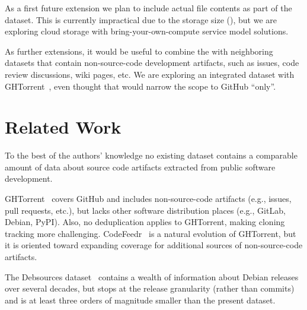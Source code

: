 As a first future extension we plan to include actual file contents as part of
the dataset. This is currently impractical due to the storage size (),
but we are exploring cloud storage with bring-your-own-compute service model
solutions.

As further extensions, it would be useful to combine the \SWHGD with neighboring
datasets that contain non-source-code development artifacts, such as issues,
code review discussions, wiki pages, etc. We are exploring an integrated
dataset with GHTorrent~\cite{DBLP:conf/msr/GousiosS12}, even thought that would
narrow the scope to GitHub ``only''.


\section{Related Work}
\label{sec:related}


To the best of the authors' knowledge no existing dataset contains a comparable
amount of data about source code artifacts extracted from public
software development.

GHTorrent~\cite{DBLP:conf/msr/GousiosS12} covers GitHub and includes
non-source-code artifacts (e.g., issues, pull requests, etc.), but lacks other
software distribution places (e.g., GitLab, Debian, PyPI). Also, no
deduplication applies to GHTorrent, making cloning tracking more challenging.
CodeFeedr~\cite{DBLP:conf/icse/VargasHKBG18} is a natural evolution of
GHTorrent, but it is oriented toward expanding coverage for additional sources
of non-source-code artifacts.

The Debsources dataset~\cite{debsources-ese-2016} contains a wealth of
information about Debian releases over several decades, but stops at the
release granularity (rather than commits) and is at least three orders of magnitude
smaller than the present dataset.
